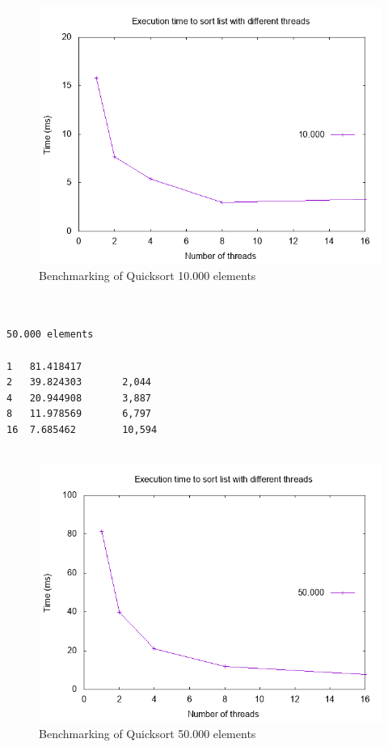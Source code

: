 \documentclass{article}
\begin{document}
\begin{figure}[h]
\centering
\includegraphics[scale=0.5]{Quicksort - 10k.png}
\caption{Benchmarking of Quicksort 10.000 elements}
\end{figure}      
\clearpage


\begin{verbatim}
    

50.000 elements

1   81.418417	 
2   39.824303       2,044  
4   20.944908       3,887	 
8   11.978569       6,797	 
16  7.685462        10,594 
 
\end{verbatim}

\begin{figure}[h]
\centering
\includegraphics[scale=0.5]{Quiccksort - 50k.png}
\caption{Benchmarking of Quicksort 50.000 elements}
\end{figure}      
\clearpage
\end{document}
